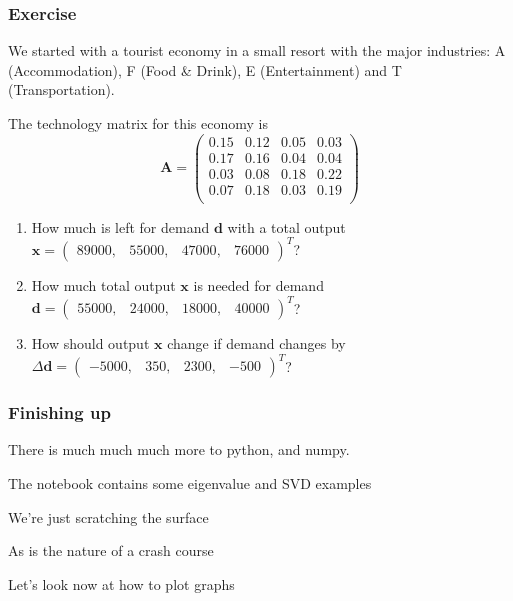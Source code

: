\documentclass[dvips, %
               xcolor=pst,
               hyperref={colorlinks=false,
               dvips,
               citecolor=magenta,menucolor=cyan,
               bookmarks,bookmarksopen,pdfpagemode=UseThumbs}
              ]{beamer}
\renewcommand{\red}{}
\renewcommand{\blue}{}}{\newcommand{\emphy}{}}
\begin{document}
\begin{frame}[fragile]\frametitle{Exercise}
We started with a tourist economy in a small resort with the major industries:
A (Accommodation), F (Food \& Drink), E (Entertainment) and T (Transportation).

{\blue
The technology matrix for this economy is
\[
\boldsymbol{A} = \left(\begin{array}{rrrr}
 0.15 & 0.12 & 0.05 & 0.03  \\
 0.17 & 0.16 & 0.04 & 0.04  \\
 0.03 & 0.08 & 0.18 & 0.22  \\
 0.07 & 0.18 & 0.03 & 0.19  \\
\end{array}\right)
\]
}

\begin{enumerate}

\item
How much is left for demand $\boldsymbol{d}$ with a total output $\red\boldsymbol{x}=
\left(\begin{array}{rrrr}89000, & 55000, & 47000, & 76000\end{array}\right)^T$?

\item
How much total output $\boldsymbol{x}$ is needed for demand
$\red\boldsymbol{d} = \left(\begin{array}{rrrr}55000, & 24000, & 18000, & 40000\end{array}\right)^T$?

\item
How should output $\boldsymbol{x}$ change if demand changes by
$\red\Delta\boldsymbol{d} =\left(\begin{array}{rrrr}-5000, & 350, & 2300, & -500\end{array}\right)^T$?

\end{enumerate}

\end{frame}

\begin{frame}[fragile]\frametitle{Finishing up}
There is much much much more to python, and numpy. 

\pause
The notebook contains some eigenvalue and SVD examples

\pause\medskip
We're just scratching the surface 

\pause\medskip
As is the nature of a crash course

\pause\medskip
Let's look now at how to plot graphs

\end{frame}
\end{document}

